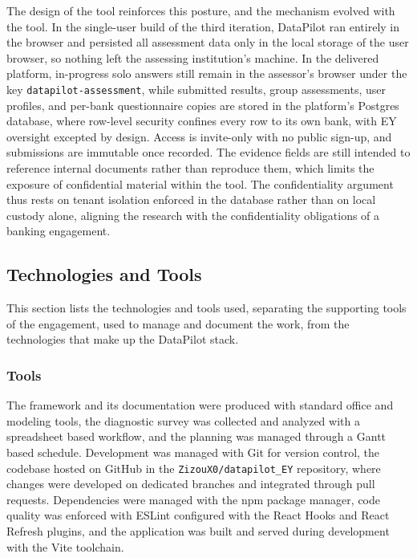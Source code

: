 The design of the tool reinforces this posture, and the mechanism evolved with the tool. In the single-user build of the third iteration, DataPilot ran entirely in the browser and persisted all assessment data only in the local storage of the user browser, so nothing left the assessing institution's machine. In the delivered platform, in-progress solo answers still remain in the assessor's browser under the key \texttt{datapilot-assessment}, while submitted results, group assessments, user profiles, and per-bank questionnaire copies are stored in the platform's Postgres database, where row-level security confines every row to its own bank, with EY oversight excepted by design. Access is invite-only with no public sign-up, and submissions are immutable once recorded. The evidence fields are still intended to reference internal documents rather than reproduce them, which limits the exposure of confidential material within the tool. The confidentiality argument thus rests on tenant isolation enforced in the database rather than on local custody alone, aligning the research with the confidentiality obligations of a banking engagement.

\subsection{Technologies and Tools}

This section lists the technologies and tools used, separating the supporting tools of the engagement, used to manage and document the work, from the technologies that make up the DataPilot stack.

\subsubsection{Tools}

The framework and its documentation were produced with standard office and modeling tools, the diagnostic survey was collected and analyzed with a spreadsheet based workflow, and the planning was managed through a Gantt based schedule. Development was managed with Git for version control, the codebase hosted on GitHub in the \texttt{ZizouX0/datapilot\_EY} repository, where changes were developed on dedicated branches and integrated through pull requests. Dependencies were managed with the npm package manager, code quality was enforced with ESLint configured with the React Hooks and React Refresh plugins, and the application was built and served during development with the Vite toolchain.

